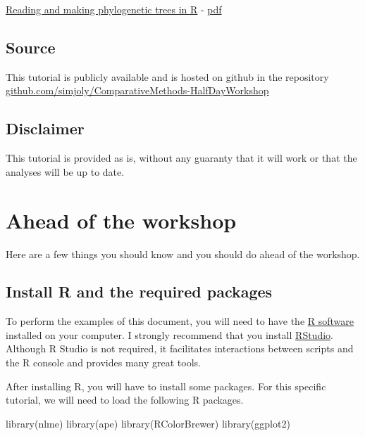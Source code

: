 \documentclass[
]{book}
\newenvironment{Shaded}{\begin{snugshade}}{\end{snugshade}}
\newcommand{\FunctionTok}[1]{\textcolor[rgb]{0.00,0.00,0.00}{#1}}
\newcommand{\NormalTok}[1]{#1}
\begin{document}
\href{http://htmlpreview.github.io/?http://github.com/simjoly/CourseComparativeMethods/blob/master/lecture2/PhylogeneticTree.html}{Reading and making phylogenetic trees in R} - \href{http://github.com/simjoly/CourseComparativeMethods/blob/master/lecture2/PhylogeneticTree.pdf}{pdf}

\hypertarget{source}{%
\section{Source}\label{source}}

This tutorial is publicly available and is hosted on github in the repository \href{https://github.com/simjoly/ComparativeMethods-HalfDayWorkshop}{github.com/simjoly/ComparativeMethods-HalfDayWorkshop}

\hypertarget{disclaimer}{%
\section{Disclaimer}\label{disclaimer}}

This tutorial is provided as is, without any guaranty that it will work or that the analyses will be up to date.

\hypertarget{before}{%
\chapter{Ahead of the workshop}\label{before}}

Here are a few things you should know and you should do ahead of the workshop.

\hypertarget{install-r-and-the-required-packages}{%
\section{Install R and the required packages}\label{install-r-and-the-required-packages}}

To perform the examples of this document, you will need to have the \href{https://www.r-project.org/}{R software} installed on your computer. I strongly recommend that you install \href{https://rstudio.com/}{RStudio}. Although R Studio is not required, it facilitates interactions between scripts and the R console and provides many great tools.

After installing R, you will have to install some packages. For this specific tutorial, we will need to load the following R packages.

\begin{Shaded}
\begin{Highlighting}[]
\FunctionTok{library}\NormalTok{(nlme)}
\FunctionTok{library}\NormalTok{(ape)}
\FunctionTok{library}\NormalTok{(RColorBrewer)}
\FunctionTok{library}\NormalTok{(ggplot2)}
\end{Highlighting}
\end{Shaded}
\end{document}

